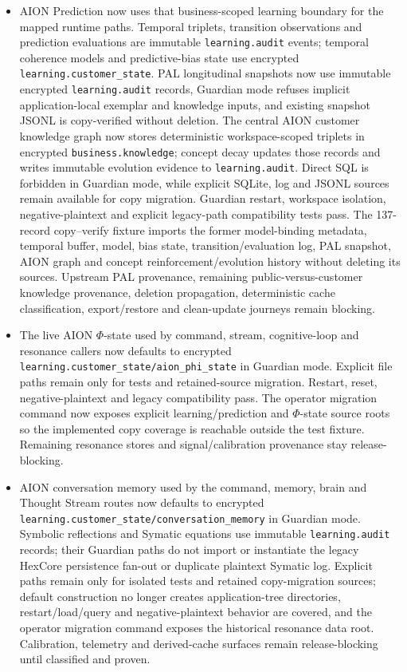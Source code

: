 \documentclass[11pt]{article}
\newcommand{\code}[1]{\texttt{#1}}
\begin{document}
\begin{itemize}
  \item AION Prediction now uses that business-scoped learning boundary for the mapped runtime paths. Temporal triplets, transition observations and prediction evaluations are immutable \code{learning.audit} events; temporal coherence models and predictive-bias state use encrypted \code{learning.customer\_state}. PAL longitudinal snapshots now use immutable encrypted \code{learning.audit} records, Guardian mode refuses implicit application-local exemplar and knowledge inputs, and existing snapshot JSONL is copy-verified without deletion. The central AION customer knowledge graph now stores deterministic workspace-scoped triplets in encrypted \code{business.knowledge}; concept decay updates those records and writes immutable evolution evidence to \code{learning.audit}. Direct SQL is forbidden in Guardian mode, while explicit SQLite, log and JSONL sources remain available for copy migration. Guardian restart, workspace isolation, negative-plaintext and explicit legacy-path compatibility tests pass. The 137-record copy--verify fixture imports the former model-binding metadata, temporal buffer, model, bias state, transition/evaluation log, PAL snapshot, AION graph and concept reinforcement/evolution history without deleting its sources. Upstream PAL provenance, remaining public-versus-customer knowledge provenance, deletion propagation, deterministic cache classification, export/restore and clean-update journeys remain blocking.
  \item The live AION $\Phi$-state used by command, stream, cognitive-loop and resonance callers now defaults to encrypted \code{learning.customer\_state/aion\_phi\_state} in Guardian mode. Explicit file paths remain only for tests and retained-source migration. Restart, reset, negative-plaintext and legacy compatibility pass. The operator migration command now exposes explicit learning/prediction and $\Phi$-state source roots so the implemented copy coverage is reachable outside the test fixture. Remaining resonance stores and signal/calibration provenance stay release-blocking.
  \item AION conversation memory used by the command, memory, brain and Thought Stream routes now defaults to encrypted \code{learning.customer\_state/conversation\_memory} in Guardian mode. Symbolic reflections and Symatic equations use immutable \code{learning.audit} records; their Guardian paths do not import or instantiate the legacy HexCore persistence fan-out or duplicate plaintext Symatic log. Explicit paths remain only for isolated tests and retained copy-migration sources; default construction no longer creates application-tree directories, restart/load/query and negative-plaintext behavior are covered, and the operator migration command exposes the historical resonance data root. Calibration, telemetry and derived-cache surfaces remain release-blocking until classified and proven.

\end{itemize}
\end{document}

